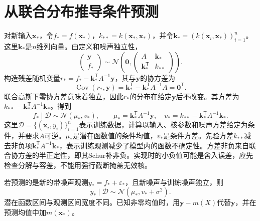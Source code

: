 \section{从联合分布推导条件预测}
对新输入$\bm x_*$，令$f_*=f(\bm x_*)$，$k_{**}=k(\bm x_*,\bm x_*)$，并令$\bm k_*=(k(\bm x_i,\bm x_*))_{i=1}^n$。这里$\bm k_*$是$n$维列向量。由定义和噪声独立性，
\begin{equation}
 \begin{pmatrix}\bm y\\f_*\end{pmatrix}
 \sim\mathcal N\left(\bm0,
 \begin{pmatrix}A&\bm k_*\\\bm k_*^{\mathsf T}&k_{**}\end{pmatrix}\right).
 \label{eq:kernel-gp-joint}
\end{equation}
构造残差随机变量$r_*=f_*-\bm k_*^{\mathsf T}A^{-1}\bm y$，其与$\bm y$的协方差为
\begin{equation}
 \operatorname{Cov}(r_*,\bm y)=\bm k_*^{\mathsf T}-\bm k_*^{\mathsf T}A^{-1}A=\bm0^{\mathsf T}.
\end{equation}
联合高斯下零协方差意味着独立，因此$r_*$的分布在给定$\bm y$后不改变。其方差为$k_{**}-\bm k_*^{\mathsf T}A^{-1}\bm k_*$。得到
\begin{equation}
 f_*\mid\mathcal D\sim\mathcal N(\mu_*,v_*),\qquad
 \mu_*=\bm k_*^{\mathsf T}A^{-1}\bm y,\quad
 v_*=k_{**}-\bm k_*^{\mathsf T}A^{-1}\bm k_*.
 \label{eq:kernel-gp-posterior}
\end{equation}
这里$\mathcal D=\{(\bm x_i,y_i)\}_{i=1}^n$表示训练数据，计算以输入、核参数和噪声方差给定为条件，并要求$A$可逆。$\mu_*$是潜在函数值的条件均值，$v_*$是条件方差。先验方差$k_{**}$减去非负项$\bm k_*^{\mathsf T}A^{-1}\bm k_*$，表示训练观测减少了模型内的函数不确定性。方差非负来自联合协方差的半正定性，即其Schur补非负。实现时的小负值可能是舍入误差，应先检查分解与容差，不能用强行截断掩盖无效核。

若预测的是新的带噪声观测$y_*=f_*+\varepsilon_*$，且新噪声与训练噪声独立，则
\begin{equation}
 y_*\mid\mathcal D\sim\mathcal N(\mu_*,v_*+\sigma^2).
 \label{eq:kernel-gp-observation}
\end{equation}
潜在函数区间与观测区间宽度不同。已知非零均值时，用$\bm y-m(X)$代替$\bm y$，并在预测均值中加$m(\bm x_*)$。

